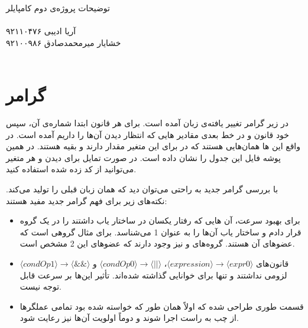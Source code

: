 \documentclass [a4paper]{article}
\begin{document}
	\noindent
	توضیحات پروژه‌ی دوم کامپایلر
	\\
	\vspace{1em}
	\\
	آریا ادیبی
	\hfill
	۹۲۱۱۰۴۷۶
	\\
	خشایار میرمحمدصادق
	\hfill
	۹۲۱۰۰۹۸۶
	\\
	\vspace{2em}
	\\
	
	\section{گرامر}
	در زیر گرامر تغییر یافته‌ی زبان آمده است. برای هر قانون ابتدا شماره‌ی آن، سپس خود قانون و در خط بعدی مقادیر 
	هایی
	که انتظار دیدن آن‌‌ها را داریم آمده است. در واقع این
	ها
	همان‌هایی هستند که در 
	برای این متغیر مقدار دارند و بقیه 
	هستند. در همین پوشه فایل
	این جدول را نشان داده است. در صورت تمایل برای دیدن 
	و
	هر متغیر می‌توانید از کد زده شده استفاده کنید.
	
	با بررسی گرامر جدید به راحتی می‌توان دید که همان زبان قبلی را تولید می‌کند. نکته‌های زیر برای فهم گرامر جدید مفید هستند:
	\begin{itemize}
		\item
		برای بهبود سرعت، آن 
		هایی 
		که رفتار یکسان در ساختار یاب داشتند را در یک گروه قرار دادم و ساختار یاب آن‌ها را به عنوان 1 
		می‌شناسد. برای مثال
		گروهی است که عضو‌های آن
		هستند. گروه‌های 
		و
		نیز وجود دارند که عضو‌های این 2 مشخص است.
		\item
		قانون‌های
		$\langle expression \rangle \rightarrow \langle expr0 \rangle$،
		$\langle condOp0 \rangle \rightarrow \langle \textbf{||} \rangle$
		و
		$\langle condOp1 \rangle \rightarrow \langle \textbf{\&\&} \rangle$
		لزومی نداشتند و تنها برای خوانایی گذاشته شده‌اند. تأثیر این‌ها بر سرعت قابل توجه نیست.
		\item
		قسمت 
		طوری طراحی شده که اولاً همان طور که خواسته شده بود تمامی عملگر‌ها از
		چب به راست اجرا شوند و دوماً اولویت آن‌ها نیز رعایت شود.
		
	\end{itemize}
	
\end{document}
